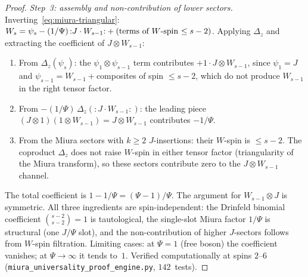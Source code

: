 \documentclass[11pt,reqno]{amsart}
\theoremstyle{definition}
\theoremstyle{remark}
\numberwithin{equation}{section}
\begin{document}
\begin{proof}
\emph{Step~3: assembly and non-contribution of lower
sectors.}
Inverting~\eqref{eq:miura-triangular}:
$W_s = \psi_s - (1/\Psi)\,{:}J \cdot W_{s-1}{:}
+ (\textup{terms of $W$-spin $\leq s-2$})$.
Applying $\Delta_z$ and extracting the coefficient of
$J \otimes W_{s-1}$:
\begin{enumerate}[label=\textup{(\roman*)}]
\item From $\Delta_z(\psi_s)$: the
  $\psi_1 \otimes \psi_{s-1}$ term contributes
  $+1 \cdot J \otimes W_{s-1}$, since
  $\psi_1 = J$ and
  $\psi_{s-1} = W_{s-1} + {}$composites of
  spin $\leq s - 2$, which do not produce $W_{s-1}$
  in the right tensor factor.
\item From $-(1/\Psi)\,\Delta_z({:}J \cdot W_{s-1}{:})$:
  the leading piece
  $(J \otimes 1)(1 \otimes W_{s-1})
  = J \otimes W_{s-1}$ contributes
  $-1/\Psi$.
\item From the Miura sectors with $k \geq 2$
  $J$-insertions: their $W$-spin is $\leq s - 2$.
  The coproduct $\Delta_z$ does not raise $W$-spin in
  either tensor factor
  \textup{(}triangularity of the Miura
  transform\textup{)},
  so these sectors contribute zero to the
  $J \otimes W_{s-1}$ channel.
\end{enumerate}
The total coefficient is $1 - 1/\Psi = (\Psi - 1)/\Psi$.
The argument for $W_{s-1} \otimes J$ is symmetric.
All three ingredients are spin-independent: the
Drinfeld binomial coefficient $\binom{s-2}{s-2} = 1$
is tautological, the single-slot Miura factor $1/\Psi$ is
structural \textup{(}one $J/\Psi$ slot\textup{)},
and the non-contribution of higher $J$-sectors follows
from $W$-spin filtration.
Limiting cases: at $\Psi = 1$
\textup{(}free boson\textup{)} the coefficient vanishes;
at $\Psi \to \infty$ it tends to~$1$.
Verified computationally at spins $2$--$6$
\textup{(}\texttt{miura\_universality\_proof\_engine.py},
$142$~tests\textup{)}.
\end{proof}
\end{document}
